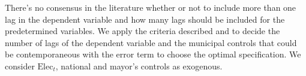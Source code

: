 

There's no consensus in the literature whether or not to include more than one lag in the dependent variable and how many lags should be included for the predetermined variables. We apply the criteria described \textcite{kripfganz2019} and \textcite{kiviet2020} to decide the number of lags of the dependent variable and the municipal controls that could be contemporaneous with the error term to choose the optimal specification. We consider $\text{Elec}_t$, national and mayor's controls as exogenous. 
